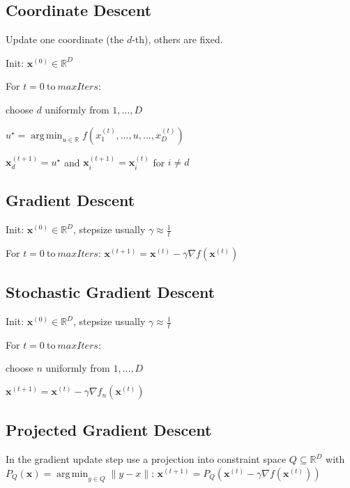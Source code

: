 \documentclass[a4paper, 11pt, landscape]{article}
\DeclareMathOperator*{\argmin}{arg\,min}
\begin{document}
\begin{multicols*}{3}
\subsection{Coordinate Descent}
Update one coordinate (the $d$-th), others are fixed.
\begin{inparaenum}
	\item Init: $\mathbf{x}^{(0)} \in \mathbb{R}^D$
	\item For $t = 0 \ \text{to} \ \mathit{maxIters}$:
	\item choose $d$ uniformly from $1, \ldots, D$
	\item $u^\star = \argmin_{u \in \mathbb{R}} f(x_1^{(t)}, \ldots, u, \ldots, x_D^{(t)})$
	\item $\mathbf{x}_d^{(t+1)} = u^\star$ and $\mathbf{x}_i^{(t+1)} = \mathbf{x}_i^{(t)}$ for $i \neq d$
\end{inparaenum}

\subsection{Gradient Descent}
\begin{inparaenum}
	\item Init: $\mathbf{x}^{(0)} \in \mathbb{R}^D$, stepsize usually $\gamma \approx \frac{1}{t}$
	\item For $t = 0 \ \text{to} \ \mathit{maxIters}$: $\mathbf{x}^{(t+1)} = \mathbf{x}^{(t)} - \gamma \nabla f(\mathbf{x}^{(t)})$
\end{inparaenum}

\subsection{Stochastic Gradient Descent}
\begin{inparaenum}
	\item Init: $\mathbf{x}^{(0)} \in \mathbb{R}^D$, stepsize usually $\gamma \approx \frac{1}{t}$
	\item For $t = 0 \ \text{to} \ \mathit{maxIters}$:
	\item choose $n$ uniformly from $1, \ldots, D$
	\item $\mathbf{x}^{(t+1)} = \mathbf{x}^{(t)} - \gamma \nabla f_n(\mathbf{x}^{(t)})$
\end{inparaenum}

\subsection{Projected Gradient Descent}
In the gradient update step use a projection into constraint space $Q \subseteq \mathbb{R}^D$ with $P_Q(\mathbf{x}) = \argmin_{y \in Q} \|y - x\|$: $\mathbf{x}^{(t+1)} = P_Q\left(\mathbf{x}^{(t)} - \gamma \nabla f(\mathbf{x}^{(t)})\right)$


\end{multicols*}
\end{document}

